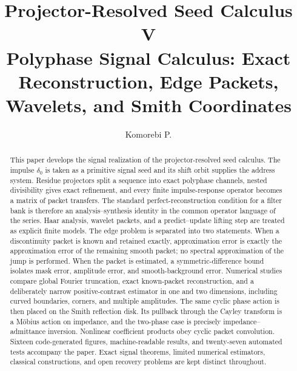 \documentclass[11pt]{article}
\title{\textbf{Projector-Resolved Seed Calculus V}\\[0.45em]
\large Polyphase Signal Calculus: Exact Reconstruction, Edge Packets, Wavelets, and Smith Coordinates}
\author{Komorebi P.}
\date{}
\theoremstyle{definition}
\theoremstyle{remark}
\begin{document}
\maketitle

\begin{abstract}
This paper develops the signal realization of the projector-resolved seed calculus. The impulse $\delta_0$ is taken as a primitive signal seed and its shift orbit supplies the address system. Residue projectors split a sequence into exact polyphase channels, nested divisibility gives exact refinement, and every finite impulse-response operator becomes a matrix of packet transfers. The standard perfect-reconstruction condition for a filter bank is therefore an analysis--synthesis identity in the common operator language of the series. Haar analysis, wavelet packets, and a predict--update lifting step are treated as explicit finite models. The edge problem is separated into two statements. When a discontinuity packet is known and retained exactly, approximation error is exactly the approximation error of the remaining smooth packet; no spectral approximation of the jump is performed. When the packet is estimated, a symmetric-difference bound isolates mask error, amplitude error, and smooth-background error. Numerical studies compare global Fourier truncation, exact known-packet reconstruction, and a deliberately narrow positive-contrast estimator in one and two dimensions, including curved boundaries, corners, and multiple amplitudes. The same cyclic phase action is then placed on the Smith reflection disk. Its pullback through the Cayley transform is a M\"obius action on impedance, and the two-phase case is precisely impedance--admittance inversion. Nonlinear coefficient products obey cyclic packet convolution. Sixteen code-generated figures, machine-readable results, and twenty-seven automated tests accompany the paper. Exact signal theorems, limited numerical estimators, classical constructions, and open recovery problems are kept distinct throughout.
\end{abstract}

\begin{center}
\end{center}
\end{document}
